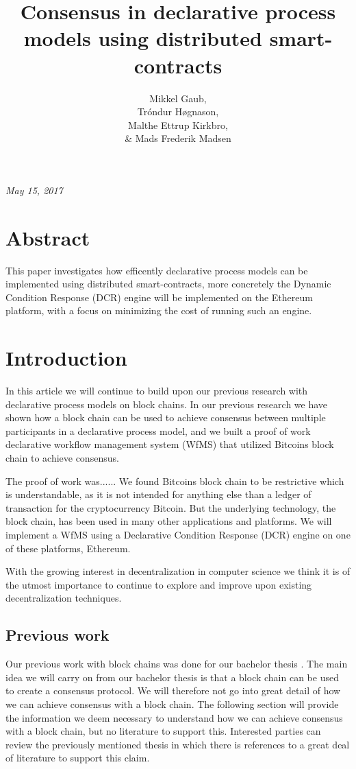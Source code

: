 \documentclass{article}
\title{Consensus in declarative process models using distributed smart-contracts}
\author{Mikkel Gaub, \\ Tróndur Høgnason, \\ Malthe Ettrup Kirkbro, \\ \& Mads Frederik Madsen }
\date{}
\begin{document}
	\begin{titlepage}
		\maketitle		
		\hspace{-18pt}
		\textit{May 15, 2017}
		\vspace{\fill}
		\section*{Abstract}
		This paper investigates how efficently declarative process models can be implemented using distributed smart-contracts, more concretely the Dynamic Condition Response (DCR) engine will be implemented on the Ethereum platform, with a focus on minimizing the cost of running such an engine.
		\thispagestyle{empty}
	\end{titlepage}
	\clearpage

	\setcounter{page}{1}

	\tableofcontents
	\pagebreak

	\section{Introduction}
	In this article we will continue to build upon our previous research with declarative process models on block chains. 
	In our previous research we have shown how a block chain can be used to achieve consensus between multiple participants in a declarative process model, and we built a proof of work declarative workflow management system (WfMS) that utilized Bitcoins block chain to achieve consensus.

	The proof of work was...... 
	We found Bitcoins block chain to be restrictive which is understandable, as it is not intended for anything else than a ledger of transaction for the cryptocurrency Bitcoin. 
	But the underlying technology, the block chain, has been used in many other applications and platforms. 
	We will implement a WfMS using a Declarative Condition Response (DCR) engine on one of these platforms, Ethereum.

	With the growing interest in decentralization in computer science we think it is of the utmost importance to continue to explore and improve upon existing decentralization techniques.

	\subsection{Previous work}
	Our previous work with block chains was done for our bachelor thesis \cite{bachelor}. The main idea we will carry on from our bachelor thesis is that a block chain can be used to create a consensus protocol. We will therefore not go into great detail of how we can achieve consensus with a block chain. The following section will provide the information we deem necessary to understand how we can achieve consensus with a block chain, but no literature to support this. Interested parties can review the previously mentioned thesis in which there is references to a great deal of literature to support this claim.
\end{document}
